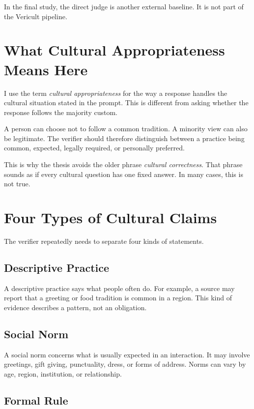 In the final study, the direct judge is another external baseline. It is not part of the Vericult pipeline.

\section{What Cultural Appropriateness Means Here}

I use the term \emph{cultural appropriateness} for the way a response handles the cultural situation stated in the prompt. This is different from asking whether the response follows the majority custom.

A person can choose not to follow a common tradition. A minority view can also be legitimate. The verifier should therefore distinguish between a practice being common, expected, legally required, or personally preferred.

This is why the thesis avoids the older phrase \emph{cultural correctness}. That phrase sounds as if every cultural question has one fixed answer. In many cases, this is not true.

\section{Four Types of Cultural Claims}

The verifier repeatedly needs to separate four kinds of statements.

\subsection{Descriptive Practice}

A descriptive practice says what people often do. For example, a source may report that a greeting or food tradition is common in a region. This kind of evidence describes a pattern, not an obligation.

\subsection{Social Norm}

A social norm concerns what is usually expected in an interaction. It may involve greetings, gift giving, punctuality, dress, or forms of address. Norms can vary by age, region, institution, or relationship.

\subsection{Formal Rule}

